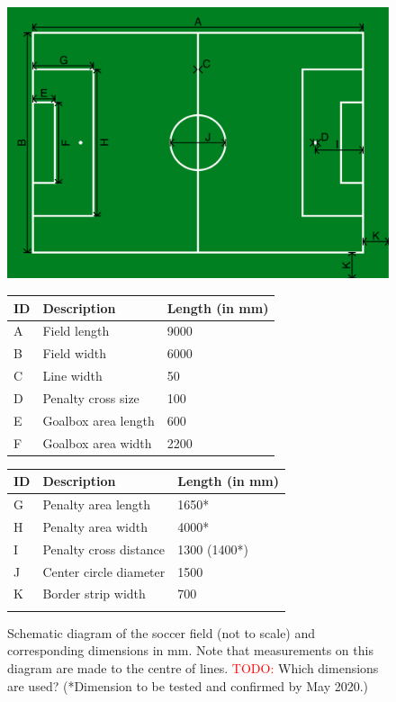 \begin{figure}[b!]
	\centering
	\centerline{\includegraphics[width=\columnwidth]{figs/fieldDimensions2020.pdf}}
	\vspace{1ex}
	\begin{tabular}{| l | l | l |}
		ID & Description & Length (in mm) \\
		\hline \hline
		A & Field length & 9000 \\
		\hline
		B & Field width & 6000 \\
		\hline
		C & Line width & 50 \\
		\hline
		D & Penalty cross size & 100 \\
		\hline
		E & Goalbox area length & 600 \\
		\hline
		F & Goalbox area width & 2200 \\
	\end{tabular}
	\begin{tabular}{|l|l|l|}
		ID & Description & Length (in mm) \\
		\hline \hline
		G & Penalty area length & 1650* \\
		\hline
		H & Penalty area width & 4000* \\
		\hline
		I & Penalty cross distance & 1300 (1400*) \\
		\hline
		J & Center circle diameter & 1500 \\
		\hline
		K & Border strip width & 700 \\
		\hline
		&  &  \\
	\end{tabular}
	\caption{Schematic diagram of the soccer field (not to scale) and corresponding dimensions in mm. Note that measurements on this diagram are made to the centre of lines. \textcolor{red}{TODO:} Which dimensions are used?
		(*Dimension to be tested and confirmed by May 2020.)} \label{fig:field_dim}
\end{figure}


